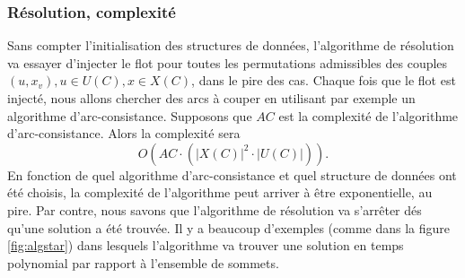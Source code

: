 \documentclass[french]{article}
\theoremstyle{definition}
\theoremstyle{remark}
\begin{document}
\subsubsection{Résolution, complexité}
Sans compter l'initialisation des structures de données, l'algorithme de résolution va essayer d'injecter le flot pour toutes les permutations admissibles des couples $(u, x_v), u \in U(C), x \in X(C)$, dans le pire des cas. Chaque fois que le flot est injecté, nous allons chercher des arcs à couper en utilisant par exemple un algorithme d'arc-consistance. Supposons que $AC$ est la complexité de l'algorithme d'arc-consistance.  
Alors la complexité sera $$O(AC \cdot (|X(C)|^2 \cdot |U(C)|)).$$
En fonction de quel algorithme d'arc-consistance et quel structure de données ont été choisis, la complexité de l'algorithme peut arriver à être exponentielle, au pire.
Par contre, nous savons que l'algorithme de résolution va s'arrêter dés qu'une solution a été trouvée. Il y a beaucoup d'exemples (comme dans la figure \ref{fig:algstar}) dans lesquels l'algorithme va trouver une solution en temps polynomial par rapport à l'ensemble de sommets.
\begin{comment}
\begin{algorithm}
	\caption{Résolution du réseau de valeurs}
	\begin{algorithmic}[1]
		\State $Q \gets U(C)$
		\State $Q' \gets X(C)$
		\While { $Q$ not empty }
		\State $u \gets dequeue(Q)$
		\State $x_v \gets dequeue(Q')$
		\State $Sol \gets (u, x_v) $ 
		\ForAll{$a \in A$}
		\If { $a$ doesn't respect \it alldiff \rm or adjacency constraint}
		\State delete $a$
		\EndIf
		\EndFor
		\EndWhile
	\end{algorithmic}
\end{algorithm}
\end{comment}

\end{document}
